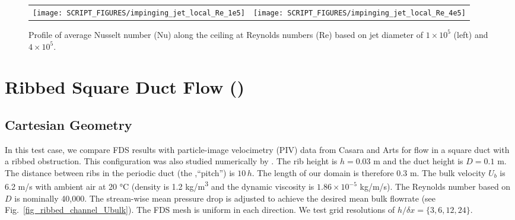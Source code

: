 \documentclass[11pt]{book}
\begin{document}
\begin{figure}[h]
   \centering
   \begin{tabular*}{\textwidth}{lr}
       \texttt{[image: SCRIPT\_FIGURES/impinging\_jet\_local\_Re\_1e5]} &
       \texttt{[image: SCRIPT\_FIGURES/impinging\_jet\_local\_Re\_4e5]} \\
   \end{tabular*}
   \caption[Impinging jet Nusselt profile]{\label{fig_impinging_jet_prof} Profile of average Nusselt number (Nu) along the ceiling at Reynolds numbers (Re) based on jet diameter of $1 \times 10^5$ (left) and $4 \times 10^5$.}
\end{figure}

\clearpage
\section{Ribbed Square Duct Flow (\texorpdfstring{}{ribbed\_channel})}
\label{sec:ribbed_channel}

\subsection{Cartesian Geometry}

In this test case, we compare FDS results with particle-image velocimetry (PIV) data from Casara and Arts \cite{Casara:1,Casara:2} for flow in a square duct with a ribbed obstruction. This configuration was also studied numerically by \cite{Lohasz:1}. The rib height is $h = 0.03$ m and the duct height is $D = 0.1$ m.  The distance between ribs in the periodic duct (the ,``pitch'') is $10 \, h$.  The length of our domain is therefore 0.3 m. The bulk velocity $U_b$ is 6.2 \si{m/s} with ambient air at 20 \si{\degreeCelsius} (density is 1.2 \si{kg/m^3} and the dynamic viscosity is $1.86 \times 10^{-5}$ \si{kg/m/s}). The Reynolds number based on $D$ is nominally 40,000. The stream-wise mean pressure drop is adjusted to achieve the desired mean bulk flowrate (see Fig.~\ref{fig_ribbed_channel_Ubulk}).  The FDS mesh is uniform in each direction.  We test grid resolutions of $h/\delta x = \{3,6,12,24\}$.
\end{document}
